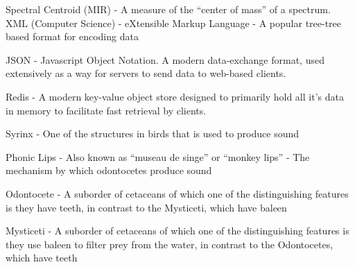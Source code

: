 Spectral Centroid (MIR) - A measure of the ``center of mass'' of a spectrum.
\\


XML (Computer Science) - eXtensible Markup Language - A popular
tree-tree based format for encoding data

JSON - Javascript Object Notation.  A modern data-exchange format,
used extensively as a way for servers to send data to web-based
clients.

Redis - A modern key-value object store designed to primarily hold all
it's data in memory to facilitate fast retrieval by clients.  

Syrinx - One of the structures in birds that is used to produce sound

Phonic Lips - Also known as ``museau de singe'' or ``monkey lips'' -
The mechanism by which odontocetes produce sound

Odontocete - A suborder of cetaceans of which one of the
distinguishing features is they have teeth, in contrast to the
Mysticeti, which have baleen

Mysticeti - A suborder of cetaceans of which one of the distinguishing
features is they use baleen to filter prey from the water, in contrast
to the Odontocetes, which have teeth
